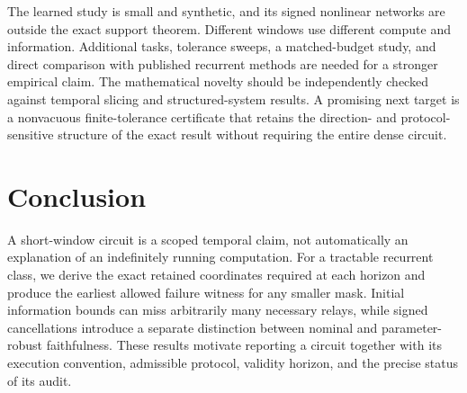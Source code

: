 The learned study is small and synthetic, and its signed nonlinear networks are outside the exact support theorem. Different windows use different compute and information. Additional tasks, tolerance sweeps, a matched-budget study, and direct comparison with published recurrent methods are needed for a stronger empirical claim. The mathematical novelty should be independently checked against temporal slicing and structured-system results. A promising next target is a nonvacuous finite-tolerance certificate that retains the direction- and protocol-sensitive structure of the exact result without requiring the entire dense circuit.

\section{Conclusion}
A short-window circuit is a scoped temporal claim, not automatically an explanation of an indefinitely running computation. For a tractable recurrent class, we derive the exact retained coordinates required at each horizon and produce the earliest allowed failure witness for any smaller mask. Initial information bounds can miss arbitrarily many necessary relays, while signed cancellations introduce a separate distinction between nominal and parameter-robust faithfulness. These results motivate reporting a circuit together with its execution convention, admissible protocol, validity horizon, and the precise status of its audit.



\clearpage
